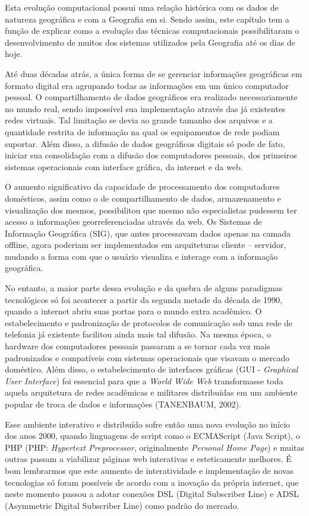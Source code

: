 Esta evolução computacional possui uma relação histórica com os dados de natureza geográfica e com a Geografia em si. Sendo assim, este capítulo tem a função de explicar como a evolução das técnicas computacionais possibilitaram o desenvolvimento de muitos dos sistemas utilizados pela Geografia até os dias de hoje. 

Até duas décadas atrás, a única forma de se gerenciar informações geográficas em formato digital era agrupando todas as informações em um único computador pessoal. O compartilhamento de dados geográficos era realizado necessariamente no mundo real, sendo impossível sua implementação através das já existentes redes virtuais. Tal limitação se devia ao grande tamanho dos arquivos e a quantidade restrita de informação na qual os equipamentos de rede podiam suportar. Além disso, a difusão de dados geográficos digitais só pode de fato,  iniciar sua consolidação com a difusão dos computadores pessoais, dos primeiros sistemas operacionais com interface gráfica, da internet e da web. 

O aumento significativo da capacidade de processamento dos computadores domésticos, assim como o de compartilhamento de dados, armazenamento e visualização dos mesmos, possibilitou que mesmo não especialistas pudessem ter acesso a informações georreferenciadas  através da web. Os Sistemas de Informação Geográfica (SIG), que antes processavam dados apenas na camada offline, agora poderiam ser implementados em arquiteturas cliente – servidor, mudando a forma com que o usuário visualiza e interage com a informação geográfica. 

No entanto, a maior parte dessa evolução e da quebra de alguns paradigmas tecnológicos só foi acontecer a partir da segunda metade da década de 1990, quando a internet abriu suas portas para o mundo extra acadêmico. O estabelecimento e padronização de protocolos de comunicação sob uma rede de telefonia já existente facilitou ainda mais tal difusão. Na mesma época, o hardware dos computadores pessoais passaram a se tornar cada vez mais padronizados e compatíveis com sistemas operacionais que visavam o mercado doméstico. Além disso, o estabelecimento de interfaces gráficas (GUI - \textit{Graphical User Interface}) foi essencial para que a \textit{World Wide Web} transformasse toda aquela arquitetura de redes acadêmicas e militares distribuídas em um ambiente popular de troca de dados e informações (TANENBAUM, 2002).

Esse ambiente interativo e distribuído sofre então uma nova evolução no início dos anos 2000, quando linguagens de script como o ECMAScript (Java Script), o PHP (PHP: \textit{Hypertext Preprocessor}, originalmente \textit{Personal Home Page}) e muitas outras passam a viabilizar páginas web interativas e esteticamente melhores. É bom lembrarmos que este aumento de interatividade e implementação de novas tecnologias só foram possíveis de acordo com a inovação da própria internet, que neste momento passou a adotar conexões DSL (Digital Subscriber Line) e ADSL (Asymmetric Digital Subscriber Line) como padrão do mercado. 

